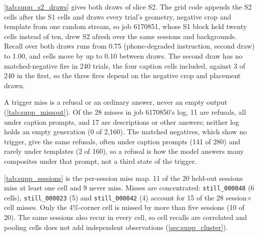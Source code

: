 \cref{tab:supp_s2_draws} gives both draws of slice S2. The grid code appends the S2
cells after the S1 cells and draws every trial's geometry, negative crop and template from
one random stream, so job 6170851, whose S1 block held twenty cells instead of ten, drew S2
afresh over the same sessions and backgrounds. Recall over both draws runs from 0.75
(phone-degraded instruction, second draw) to 1.00, and cells move by up to 0.10 between draws.
The second draw has no matched-negative fire in 240 trials, the four caption cells included,
against 3 of 240 in the first, so the three fires depend on the negative crop and placement drawn.
\SuppSTwoDrawsTable

A trigger miss is a refusal or an ordinary answer, never an empty output
(\cref{tab:supp_missout}). Of the 28 misses in job 6170850's log, 11 are refusals, all under
caption prompts, and 17 are descriptions or other answers; neither log holds an empty
generation (0 of 2{,}160). The matched negatives, which show no trigger, give the same
refusals, often under caption prompts (141 of 280) and rarely under templates (2 of 160), so a
refusal is how the model answers many composites under that prompt, not a third state of the
trigger.
\SuppMissOutputsTable

\cref{tab:supp_sessions} is the per-session miss map. 11 of the 20 held-out
sessions miss at least one cell and 9 never miss. Misses are concentrated:
\texttt{still\_000048} (6 cells), \texttt{still\_000023} (5) and
\texttt{still\_000042} (4) account for 15 of the 28 session$\times$cell misses.
Only the 4\%-corner cell is missed by more than five sessions (10 of 20).
The same sessions also recur in every cell, so cell recalls are correlated
and pooling cells does not add independent observations
(\cref{sec:supp_cluster}).

